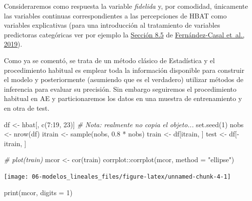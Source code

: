 \documentclass[
  spanish,
]{book}
\newenvironment{Shaded}{\begin{snugshade}}{\end{snugshade}}
\newcommand{\AttributeTok}[1]{\textcolor[rgb]{0.77,0.63,0.00}{#1}}
\newcommand{\CommentTok}[1]{\textcolor[rgb]{0.56,0.35,0.01}{\textit{#1}}}
\newcommand{\DecValTok}[1]{\textcolor[rgb]{0.00,0.00,0.81}{#1}}
\newcommand{\FloatTok}[1]{\textcolor[rgb]{0.00,0.00,0.81}{#1}}
\newcommand{\FunctionTok}[1]{\textcolor[rgb]{0.00,0.00,0.00}{#1}}
\newcommand{\NormalTok}[1]{#1}
\newcommand{\OtherTok}[1]{\textcolor[rgb]{0.56,0.35,0.01}{#1}}
\newcommand{\SpecialCharTok}[1]{\textcolor[rgb]{0.00,0.00,0.00}{#1}}
\newcommand{\StringTok}[1]{\textcolor[rgb]{0.31,0.60,0.02}{#1}}
\theoremstyle{break}
\theoremstyle{definition}
\theoremstyle{definition}
\theoremstyle{definition}
\theoremstyle{definition}
\theoremstyle{remark}
\begin{document}
Consideraremos como respuesta la variable \emph{fidelida} y, por comodidad, únicamente las variables continuas correspondientes a las percepciones de HBAT como variables explicativas (para una introducción al tratamiento de variables predictoras categóricas ver por ejemplo la \href{https://rubenfcasal.github.io/intror/modelos-lineales.html\#regresion-con-variables-categoricas}{Sección 8.5} de \protect\hyperlink{ref-fernandez2019intror}{Fernández-Casal et~al., 2019}).

Como ya se comentó, se trata de un método clásico de Estadística y el procedimiento habitual es emplear toda la información disponible para construir el modelo y posteriormente (asumiendo que es el verdadero) utilizar métodos de inferencia para evaluar su precisión.
Sin embargo seguiremos el procedimiento habitual en AE y particionaremos los datos en una muestra de entrenamiento y en otra de test.

\begin{Shaded}
\begin{Highlighting}[]
\NormalTok{df }\OtherTok{\textless{}{-}}\NormalTok{ hbat[, }\FunctionTok{c}\NormalTok{(}\DecValTok{7}\SpecialCharTok{:}\DecValTok{19}\NormalTok{, }\DecValTok{23}\NormalTok{)]  }\CommentTok{\# Nota: realmente no copia el objeto...}
\FunctionTok{set.seed}\NormalTok{(}\DecValTok{1}\NormalTok{)}
\NormalTok{nobs }\OtherTok{\textless{}{-}} \FunctionTok{nrow}\NormalTok{(df)}
\NormalTok{itrain }\OtherTok{\textless{}{-}} \FunctionTok{sample}\NormalTok{(nobs, }\FloatTok{0.8} \SpecialCharTok{*}\NormalTok{ nobs)}
\NormalTok{train }\OtherTok{\textless{}{-}}\NormalTok{ df[itrain, ]}
\NormalTok{test }\OtherTok{\textless{}{-}}\NormalTok{ df[}\SpecialCharTok{{-}}\NormalTok{itrain, ]}

\CommentTok{\# plot(train)}
\NormalTok{mcor }\OtherTok{\textless{}{-}} \FunctionTok{cor}\NormalTok{(train)}
\NormalTok{corrplot}\SpecialCharTok{::}\FunctionTok{corrplot}\NormalTok{(mcor, }\AttributeTok{method =} \StringTok{"ellipse"}\NormalTok{)}
\end{Highlighting}
\end{Shaded}

\begin{center}\texttt{[image: 06-modelos\_lineales\_files/figure-latex/unnamed-chunk-4-1]} \end{center}

\begin{Shaded}
\begin{Highlighting}[]
\FunctionTok{print}\NormalTok{(mcor, }\AttributeTok{digits =} \DecValTok{1}\NormalTok{)}
\end{Highlighting}
\end{Shaded}
\end{document}
